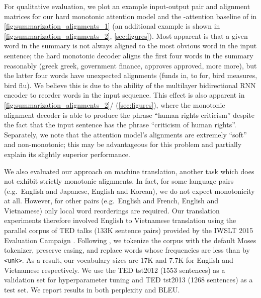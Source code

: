 \documentclass{article}
\makeatletter
\renewcommand{\paragraph}{\@startsection{paragraph}{4}{\z@}{0.25ex \@plus 0ex \@minus .2ex}{-1em}{\normalfont\normalsize\bfseries}}
\makeatother
\begin{document}
For qualitative evaluation, we plot an example input-output pair and alignment matrices for our hard monotonic attention model and the -attention baseline of  in \cref{fig:summarization_alignments_1} (an additional example is shown in \cref{fig:summarization_alignments_2}, \cref{sec:figures}).
Most apparent is that a given word in the summary is not always aligned to the most obvious word in the input sentence; the hard monotonic decoder aligns the first four words in the summary reasonably (greek  greek, government  finance, approves  approved, more  more), but the latter four words have unexpected alignments (funds  in, to  for, bird  measures, bird  flu).
We believe this is due to the ability of the multilayer bidirectional RNN encoder to reorder words in the input sequence.
This effect is also apparent in \cref{fig:summarization_alignments_2}/ (\cref{sec:figures}), where the monotonic alignment decoder is able to produce the phrase ``human rights criticism'' despite the fact that the input sentence has the phrase ``criticism of human rights''.
Separately, we note that the  attention model's alignments are extremely ``soft'' and non-monotonic; this may be advantageous for this problem and partially explain its slightly superior performance.

\paragraph{Machine Translation}

We also evaluated our approach on machine translation, another task which does not exhibit strictly monotonic alignments.
In fact, for some language pairs (e.g.\ English and Japanese, English and Korean), we do not expect monotonicity at all.
However, for other pairs (e.g.\ English and French, English and Vietnamese) only local word reorderings are required.
Our translation experiments therefore involved English to Vietnamese translation using the parallel corpus of TED talks (133K sentence pairs) provided by the IWSLT 2015 Evaluation Campaign .
Following , we tokenize the corpus with the default Moses tokenizer, preserve casing, and replace words whose frequencies are less than  by \texttt{<unk>}.
As a result, our vocabulary sizes are 17K and 7.7K for English and Vietnamese respectively. We use the TED tst2012 (1553 sentences) as a validation set for hyperparameter tuning and TED tst2013 (1268 sentences) as a test set. We report results in both perplexity and BLEU.
\end{document}
